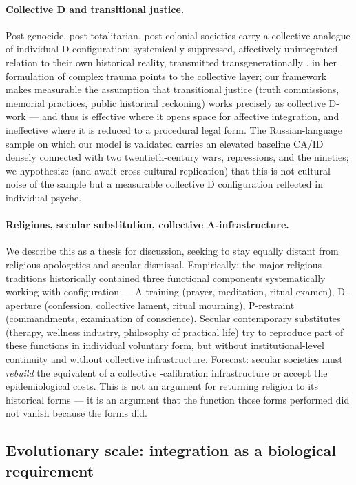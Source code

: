\paragraph{Collective D and transitional justice.} Post-genocide, post-totalitarian, post-colonial societies carry a collective analogue of individual D configuration: systemically suppressed, affectively unintegrated relation to their own historical reality, transmitted transgenerationally \citep{yehuda2015, meaney2001}. \citet{herman1992} in her formulation of complex trauma points to the collective layer; our framework makes measurable the assumption that transitional justice (truth commissions, memorial practices, public historical reckoning) works precisely as collective D-work --- and thus is effective where it opens space for affective integration, and ineffective where it is reduced to a procedural legal form. The Russian-language sample on which our model is validated carries an elevated baseline CA/ID densely connected with two twentieth-century wars, repressions, and the nineties; we hypothesize (and await cross-cultural replication) that this is not cultural noise of the sample but a measurable collective D configuration reflected in individual psyche.

\paragraph{Religions, secular substitution, collective A-infrastructure.} We describe this as a thesis for discussion, seeking to stay equally distant from religious apologetics and secular dismissal. Empirically: the major religious traditions historically contained three functional components systematically working with \DEIC{} configuration --- A-training (prayer, meditation, ritual examen), D-aperture (confession, collective lament, ritual mourning), P-restraint (commandments, examination of conscience). Secular contemporary substitutes (therapy, wellness industry, philosophy of practical life) try to reproduce part of these functions in individual voluntary form, but without institutional-level continuity and without collective infrastructure. Forecast: secular societies must \emph{rebuild} the equivalent of a collective \DEIC{}-calibration infrastructure or accept the epidemiological costs. This is not an argument for returning religion to its historical forms --- it is an argument that the function those forms performed did not vanish because the forms did.

\subsection{Evolutionary scale: integration as a biological requirement}
\label{subsec:evolutionary}

